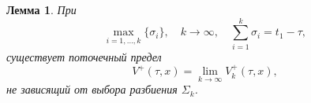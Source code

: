 \documentclass{beamer}
\newtheorem{lemma}{Лемма}
\begin{document}
\begin{frame}

\begin{lemma}
    При
    \[ 
        \max_{i = 1,\dots,k} \{\sigma_i\}, \quad k \to \infty, \quad \sum_{i = 1}^k \sigma_i = 
         t_1 - \tau, 
    \]
    существует поточечный предел
    \[
        V^+(\tau, x) = \lim_{k \to \infty} V_k^+(\tau, x),
    \]
    не зависящий от выбора разбиения \( \Sigma_k \).
\end{lemma}

\end{frame}
\end{document}
